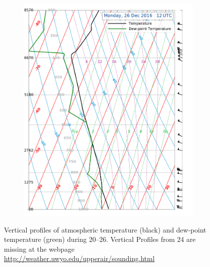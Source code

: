 \begin{landscape}
\begin{figure}
\begin{subfigure}[b]{0.66\textheight}
			\includegraphics[trim={0cm 0.2cm 2.5cm .5cm},clip,
			width=\textwidth]{./fig_Sounding/20161226_12Z}
			\caption{}\label{fig:Soun26}
		\end{subfigure}
		
		\caption{Vertical profiles of atmospheric temperature (black) and dew-point temperature (green) during \SIrange{20}{26}{\dec}. Vertical Profiles from \SI{24}{\dec} are missing at the webpage \url{http://weather.uwyo.edu/upperair/sounding.html}}\label{fig:sounding}
	\end{figure}
\end{landscape}